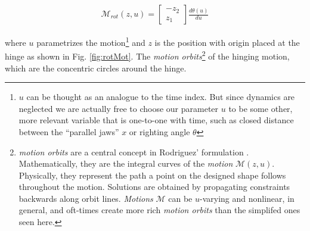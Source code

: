\documentclass[letterpaper, 10 pt, conference]{ieeeconf}
\begin{document}
\begin{align}
\mathcal{M}_{rot}(z,u) = \begin{bmatrix} -z_2 \\ z_1 \end{bmatrix} \frac{d\theta(u)}{du}
\end{align}

where $u$ parametrizes the motion\footnote{$u$ can be thought as an analogue to the time index. But since dynamics are neglected we are actually free to choose our parameter $u$ to be some other, more relevant variable that is one-to-one with time, such as closed distance between the ``parallel jaws'' $x$ or righting angle $\theta$}
 and $z$ is the position with origin placed at the hinge as shown in Fig. \ref{fig:rotMot}.
The \textit{motion orbits}\footnote{\textit{motion orbits} are a central concept in Rodriguez' formulation \cite{rodriguez2013effector}. Mathematically, they are the integral curves of the \textit{motion} $\mathcal{M}(z,u)$. Physically, they represent the path a point on the designed shape follows throughout the motion. Solutions are obtained by propagating constraints backwards along orbit lines. \textit{Motions} $\mathcal{M}$ can be $u$-varying and nonlinear, in general, and oft-times create more rich \textit{motion orbits} than the simplifed ones seen here.}
 of the hinging motion, which are the concentric circles around the hinge.
\end{document}
